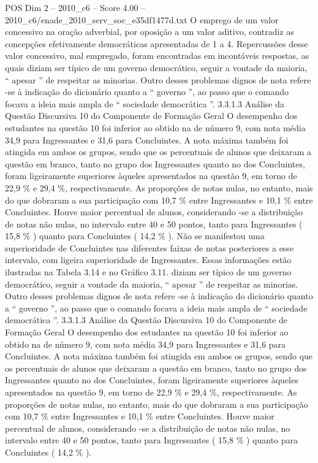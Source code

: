 \begin{textsample}{POS Dim 2 – 2010\_c6 – Score 4.00 – 2010\_c6/enade\_2010\_serv\_soc\_e35df1477d.txt}
O emprego de um valor concessivo na oração adverbial, por oposição a um valor aditivo, contradiz as concepções efetivamente democráticas apresentadas de 1 a 4.
Repercussões desse valor concessivo, mal empregado, foram encontradas em incontáveis respostas, as quais diziam ser típico de um governo democrático, seguir a vontade da maioria, “ apesar ” de respeitar as minorias.
Outro desses problemas dignos de nota refere -se à indicação do dicionário quanto a “ governo ”, ao passo que o comando focava a ideia mais ampla de “ sociedade democrática ”. 3.3.1.3 Análise da Questão Discursiva 10 do Componente de Formação Geral O desempenho dos estudantes na questão 10 foi inferior ao obtido na de número 9, com nota média 34,9 para Ingressantes e 31,6 para Concluintes.
A nota máxima também foi atingida em ambos os grupos, sendo que os percentuais de alunos que deixaram a questão em branco, tanto no grupo dos Ingressantes quanto no dos Concluintes, foram ligeiramente superiores àqueles apresentados na questão 9, em torno de 22,9 \% e 29,4 \%, respectivamente.
As proporções de notas nulas, no entanto, mais do que dobraram a sua participação com 10,7 \% entre Ingressantes e 10,1 \% entre Concluintes.
Houve maior percentual de alunos, considerando -se a distribuição de notas não nulas, no intervalo entre 40 e 50 pontos, tanto para Ingressantes ( 15,8 \% ) quanto para Concluintes ( 14,2 \% ).
Não se manifestou uma superioridade de Concluintes nas diferentes faixas de notas posteriores a esse intervalo, com ligeira superioridade de Ingressantes.
Essas informações estão ilustradas na Tabela 3.14 e no Gráfico 3.11. diziam ser típico de um governo democrático, seguir a vontade da maioria, “ apesar ” de respeitar as minorias.
Outro desses problemas dignos de nota refere -se à indicação do dicionário quanto a “ governo ”, ao passo que o comando focava a ideia mais ampla de “ sociedade democrática ”. 3.3.1.3 Análise da Questão Discursiva 10 do Componente de Formação Geral O desempenho dos estudantes na questão 10 foi inferior ao obtido na de número 9, com nota média 34,9 para Ingressantes e 31,6 para Concluintes.
A nota máxima também foi atingida em ambos os grupos, sendo que os percentuais de alunos que deixaram a questão em branco, tanto no grupo dos Ingressantes quanto no dos Concluintes, foram ligeiramente superiores àqueles apresentados na questão 9, em torno de 22,9 \% e 29,4 \%, respectivamente.
As proporções de notas nulas, no entanto, mais do que dobraram a sua participação com 10,7 \% entre Ingressantes e 10,1 \% entre Concluintes.
Houve maior percentual de alunos, considerando -se a distribuição de notas não nulas, no intervalo entre 40 e 50 pontos, tanto para Ingressantes ( 15,8 \% ) quanto para Concluintes ( 14,2 \% ).

\end{textsample}
